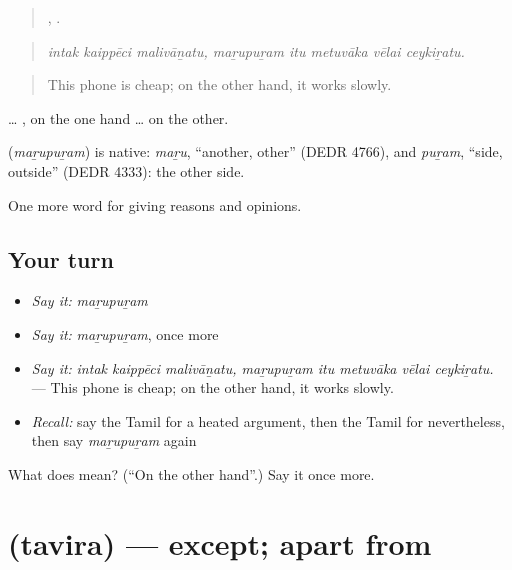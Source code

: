 \begin{quote}
  ,     .
\end{quote}

\begin{quote}
\emph{intak kaippēci malivāṉatu, maṟupuṟam itu metuvāka vēlai ceykiṟatu.}
\end{quote}

\begin{quote}
This phone is cheap; on the other hand, it works slowly.
\end{quote}

 … , on the one hand … on the other.

\begin{cousinweb}
\textbf{} (\emph{maṟupuṟam}) is native: \emph{maṟu}, \textquotedblleft{}another, other\textquotedblright{} (DEDR 4766), and \emph{puṟam}, \textquotedblleft{}side, outside\textquotedblright{} (DEDR 4333): the other side.
\end{cousinweb}

\begin{grammarlens}[title={What you've built}]
One more word for giving reasons and opinions.
\end{grammarlens}

\subsection*{Your turn}
\begin{itemize}
\raggedright
  \item \emph{Say it:} \emph{maṟupuṟam}
  \item \emph{Say it:} \emph{maṟupuṟam}, once more
  \item \emph{Say it:} \emph{intak kaippēci malivāṉatu, maṟupuṟam itu metuvāka vēlai ceykiṟatu.} — This phone is cheap; on the other hand, it works slowly.
  \item \emph{Recall:} say the Tamil for a heated argument, then the Tamil for nevertheless, then say \emph{maṟupuṟam} again
\end{itemize}

\begin{tcolorbox}[breakable,colback=teal!4,colframe=teal!35!black,title={Before you move on}]
What does  mean? (\textquotedblleft{}On the other hand\textquotedblright{}.) Say it once more.
\end{tcolorbox}
\section[\texorpdfstring{\ta{தவிர} (tavira)}{தவிர (tavira)}]{ (tavira) — except; apart from}


